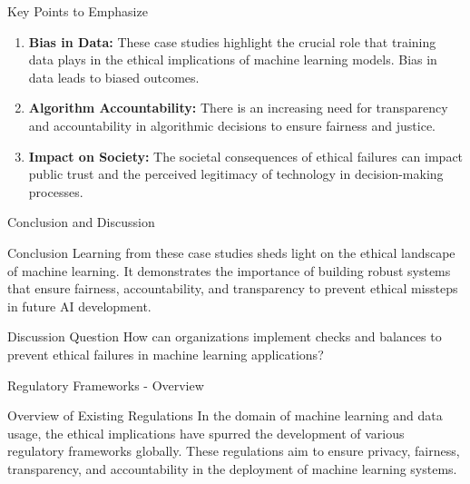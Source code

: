 \documentclass[aspectratio=169]{beamer}
\begin{document}
\begin{frame}[fragile]{Key Points to Emphasize}
    \begin{enumerate}
        \item \textbf{Bias in Data:} 
            These case studies highlight the crucial role that training data plays in the ethical implications of machine learning models. Bias in data leads to biased outcomes.
        \item \textbf{Algorithm Accountability:} 
            There is an increasing need for transparency and accountability in algorithmic decisions to ensure fairness and justice.
        \item \textbf{Impact on Society:} 
            The societal consequences of ethical failures can impact public trust and the perceived legitimacy of technology in decision-making processes.
    \end{enumerate}
\end{frame}

\begin{frame}[fragile]{Conclusion and Discussion}
    \begin{block}{Conclusion}
        Learning from these case studies sheds light on the ethical landscape of machine learning. It demonstrates the importance of building robust systems that ensure fairness, accountability, and transparency to prevent ethical missteps in future AI development.
    \end{block}
    \begin{block}{Discussion Question}
        How can organizations implement checks and balances to prevent ethical failures in machine learning applications?
    \end{block}
\end{frame}

\begin{frame}[fragile]{Regulatory Frameworks - Overview}
    \begin{block}{Overview of Existing Regulations}
        In the domain of machine learning and data usage, the ethical implications have spurred the development of various regulatory frameworks globally. These regulations aim to ensure privacy, fairness, transparency, and accountability in the deployment of machine learning systems.
    \end{block}
\end{frame}
\end{document}
